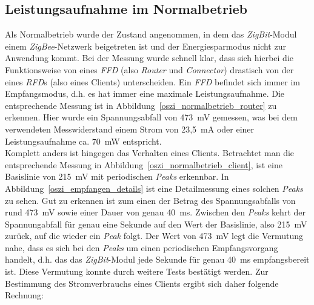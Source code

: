 \subsection{Leistungsaufnahme im Normalbetrieb}\label{leistungsaufnahme_normalbetrieb}
\label{ergebnis_normal}
\Abbildungps{!htb}{0.75}{oszi/normalbetrieb_router.jpg}{oszi_normalbetrieb_router}{Router oder Koordinator im Normalbetrieb. 
}   
\Abbildungps{!htb}{0.75}{oszi/normalbetrieb_client.jpg}{oszi_normalbetrieb_client}{Endknoten im Normalbetrieb ohne Energiesparmodus. 
}

Als Normalbetrieb wurde der Zustand angenommen, in dem das \emph{ZigBit}-Modul einem \emph{ZigBee}-Netzwerk beigetreten
ist und der Energiesparmodus nicht zur Anwendung kommt. Bei der Messung wurde schnell klar, dass sich hierbei die
Funktionsweise von eines \emph{FFD} (also \emph{Router} und \emph{Connector}) drastisch von der eines \emph{RFD}s (also 
eines Clients) 
unterscheiden. Ein \emph{FFD} befindet sich immer im Empfangsmodus, d.h. es hat immer eine maximale Leistungsaufnahme. 
Die entsprechende Messung ist in Abbildung~\ref{oszi_normalbetrieb_router} zu erkennen. Hier wurde ein Spannungsabfall
von 473~mV gemessen, was bei dem verwendeten Messwiderstand einem Strom von 23,5~mA oder einer Leistungsaufnahme ca. 70~mW entspricht.\\
Komplett anders ist hingegen das Verhalten eines Clients. Betrachtet man die entsprechende Messung in
Abbildung~\ref{oszi_normalbetrieb_client}, ist eine Basislinie von 215~mV mit periodischen \emph{Peaks} erkennbar. 
In Abbildung~\ref{oszi_empfangen_details} ist eine Detailmessung eines solchen \emph{Peaks} zu sehen.  Gut zu erkennen ist zum 
einen der Betrag des Spannungsabfalls von rund 473~mV sowie einer Dauer von genau 40~ms. Zwischen den \emph{Peaks} kehrt der 
Spannungabfall für genau eine Sekunde auf den Wert der Basislinie, also 215~mV zurück, auf die wieder ein \emph{Peak} folgt.
Der Wert von 473~mV legt die Vermutung nahe, dass es sich bei den \emph{Peaks} um einen periodischen Empfangsvorgang handelt,
d.h. das das \emph{ZigBit}-Modul jede Sekunde für genau 40~ms empfangsbereit ist. Diese Vermutung konnte durch weitere
Tests bestätigt werden. Zur Bestimmung des Stromverbrauchs eines Clients ergibt sich daher folgende Rechnung:

